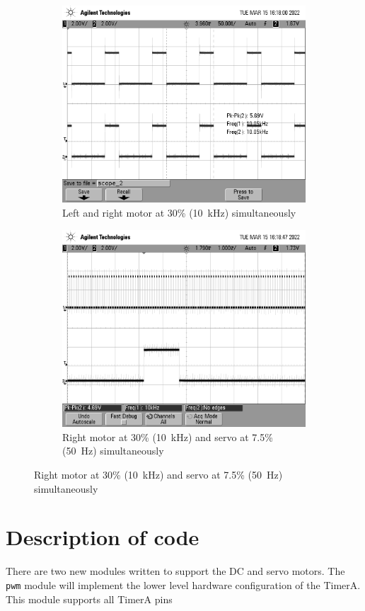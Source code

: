 \documentclass[CMPE]{../KGCOEReport}
\def\code#1{\texttt{#1}}
\begin{document}
	\begin{figure}[ht]
		\centering
		 \begin{subfigure}[b]{0.4\textwidth}
		     \centering
		     \includegraphics[width=\textwidth]{scope_2}
		     \caption{Left and right motor at 30\% (\SI{10}{\kilo\hertz}) simultaneously}
		     \label{fig:cap3}
		 \end{subfigure}
		 \hfill
		 \begin{subfigure}[b]{0.4\textwidth}
		     \centering
		     \includegraphics[width=\textwidth]{scope_3}
		     \caption{Right motor at 30\% (\SI{10}{\kilo\hertz}) and servo at 7.5\% (\SI{50}{\hertz}) simultaneously}
		     \label{fig:cap4}
		 \end{subfigure}
	\end{figure}

	\pagebreak
	\section*{Description of code}

	There are two new modules written to support the DC and servo motors. The \code{pwm}
	module will implement the lower level hardware configuration of the TimerA. This
	module supports all TimerA pins 

%
\end{document}
